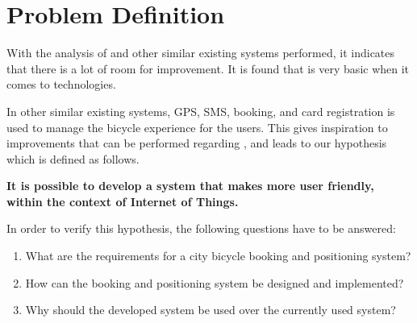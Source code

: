\section{Problem Definition}
With the analysis of \bycykel and other similar existing systems performed, it indicates that there is a lot of room for improvement.
It is found that \bycykel is very basic when it comes to technologies.

In other similar existing systems, GPS, SMS, booking, and card registration is used to manage the bicycle experience for the users.
This gives inspiration to improvements that can be performed regarding \bycykelwithoutspace, and leads to our hypothesis which is defined as follows.

\begin{center}
\textbf{It is possible to develop a system that makes \bycykelwithoutspace more user friendly, within the context of Internet of Things.}
\end{center}

In order to verify this hypothesis, the following questions have to be answered:

\begin{enumerate}
	\item What are the requirements for a city bicycle booking and positioning system?
	\item How can the booking and positioning system be designed and implemented?
	\item Why should the developed system be used over the currently used system?
\end{enumerate}